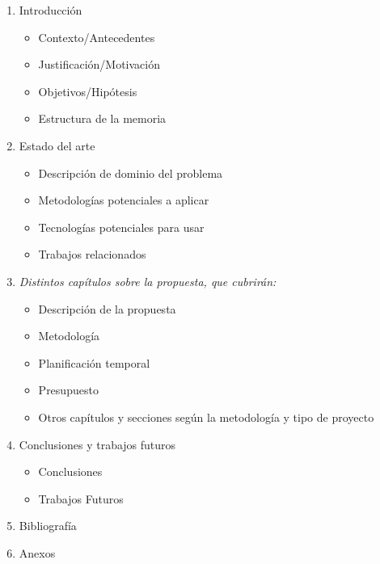 \begin{enumerate}
    \item Introducción
        \begin{itemize}
            \item Contexto/Antecedentes
            \item Justificación/Motivación
            \item Objetivos/Hipótesis
            \item Estructura de la memoria
        \end{itemize}
    \item Estado del arte
        \begin{itemize}
            \item Descripción de dominio del problema
            \item Metodologías potenciales a aplicar
            \item Tecnologías potenciales para usar
            \item Trabajos relacionados
        \end{itemize}
    \item \textit{Distintos capítulos sobre la propuesta, que cubrirán:}
    \begin{itemize}
            \item Descripción de la propuesta
            \item Metodología
            \item Planificación temporal
            \item Presupuesto
            \item Otros capítulos y secciones según la metodología y tipo de proyecto
        \end{itemize}
    \item Conclusiones y trabajos futuros
    \begin{itemize}
            \item Conclusiones
            \item Trabajos Futuros
        \end{itemize}
    \item Bibliografía
    \item Anexos
\end{enumerate}

